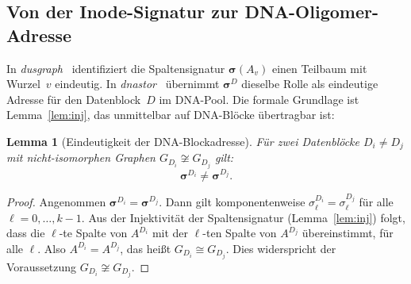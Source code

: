 ﻿\documentclass[a4paper,12pt]{article}
\theoremstyle{definition}
\theoremstyle{plain}
\newtheorem{lemma}{Lemma}[section]
\begin{document}
\subsection{Von der Inode-Signatur zur DNA-Oligomer-Adresse}

In \textit{dusgraph}~\cite{dusgraph} identifiziert die Spaltensignatur
$\boldsymbol{\sigma}(A_v)$ einen Teilbaum mit Wurzel~$v$ eindeutig.
In \textit{dnastor}~\cite{dnastor} übernimmt
$\boldsymbol{\sigma}^D$ dieselbe Rolle als eindeutige Adresse für den
Datenblock~$D$ im DNA-Pool.  Die formale Grundlage ist Lemma~\ref{lem:inj},
das unmittelbar auf DNA-Blöcke übertragbar ist:

\begin{lemma}[Eindeutigkeit der DNA-Blockadresse]
\label{lem:dna_eindeutig}
  Für zwei Datenblöcke $D_i \neq D_j$ mit nicht-isomorphen Graphen
  $G_{D_i} \not\cong G_{D_j}$ gilt:
  \[
    \boldsymbol{\sigma}^{D_i} \neq \boldsymbol{\sigma}^{D_j}.
  \]
\end{lemma}

\begin{proof}
  Angenommen $\boldsymbol{\sigma}^{D_i} = \boldsymbol{\sigma}^{D_j}$.
  Dann gilt komponentenweise $\sigma_\ell^{D_i} = \sigma_\ell^{D_j}$
  für alle $\ell = 0, \ldots, k-1$.
  Aus der Injektivität der Spaltensignatur (Lemma~\ref{lem:inj}) folgt,
  dass die $\ell$-te Spalte von $A^{D_i}$ mit der $\ell$-ten Spalte von
  $A^{D_j}$ übereinstimmt, für alle $\ell$.
  Also $A^{D_i} = A^{D_j}$, das heißt $G_{D_i} \cong G_{D_j}$.
  Dies widerspricht der Voraussetzung $G_{D_i} \not\cong G_{D_j}$. 
\end{proof}
\end{document}
